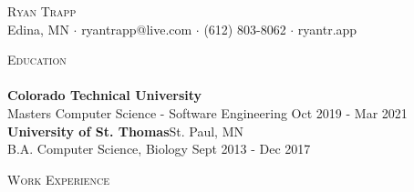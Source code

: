 \documentclass[a4paper]{article}
\newcommand{\lineunder} {
    \vspace*{-8pt} \\
    \hspace*{-18pt} \hrulefill \\
}
\newcommand{\header} [1] {
    {\hspace*{-18pt}\vspace*{6pt} \textsc{#1}}
    \vspace*{-6pt} \lineunder
}
\begin{document}
\vspace*{-40pt}

    

\vspace*{-10pt}
\begin{center}
    {\Huge \scshape {Ryan Trapp}}\\
    Edina, MN $\cdot$ ryantrapp@live.com $\cdot$ (612) 803-8062 $\cdot$ ryantr.app\\
\end{center}

\header{Education}
\textbf{Colorado Technical University}\\
Masters Computer Science - Software Engineering \hfill Oct 2019 - Mar 2021\\
\vspace{2mm}
\textbf{University of St. Thomas}\hfill St. Paul, MN\\
B.A. Computer Science, Biology \hfill Sept 2013 - Dec 2017\\
\vspace{2mm}

\header{Work Experience}
\vspace{1mm}
\end{document}
